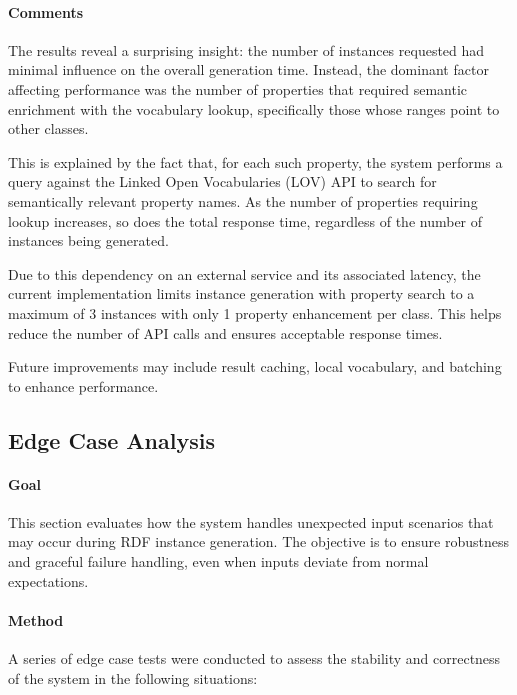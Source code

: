\paragraph{Comments}
The results reveal a surprising insight: the number of instances requested had minimal influence on the overall generation time. Instead, the dominant factor affecting performance was the number of properties that required semantic enrichment with the vocabulary lookup, specifically those whose ranges point to other classes.

This is explained by the fact that, for each such property, the system performs a query against the Linked Open Vocabularies (LOV) API to search for semantically relevant property names. As the number of properties requiring lookup increases, so does the total response time, regardless of the number of instances being generated.

Due to this dependency on an external service and its associated latency, the current implementation limits instance generation with property search to a maximum of 3 instances with only 1 property enhancement per class. This helps reduce the number of API calls and ensures acceptable response times. 

Future improvements may include result caching, local vocabulary, and batching to enhance performance. 

\subsection{Edge Case Analysis}

\paragraph{Goal}
This section evaluates how the system handles unexpected input scenarios that may occur during RDF instance generation. The objective is to ensure robustness and graceful failure handling, even when inputs deviate from normal expectations.

\paragraph{Method}
A series of edge case tests were conducted to assess the stability and correctness of the system in the following situations:

